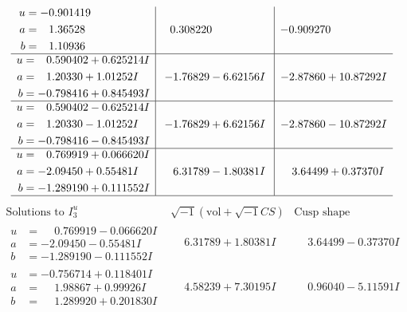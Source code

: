 \documentclass[1p]{elsarticle_modified}
\theoremstyle{definition}
\newcommand{\I}{\sqrt{-1}}
\begin{document}
$$\begin{array}{c|c|c}
\begin{aligned}
u &= -0.901419\phantom{ +0.000000I} \\
a &= \phantom{-}1.36528\phantom{ +0.000000I} \\
b &= \phantom{-}1.10936\phantom{ +0.000000I}\end{aligned}
 & \phantom{-}0.308220\phantom{ +0.000000I} & -0.909270\phantom{ +0.000000I} \\ \hline\begin{aligned}
u &= \phantom{-}0.590402 + 0.625214 I \\
a &= \phantom{-}1.20330 + 1.01252 I \\
b &= -0.798416 + 0.845493 I\end{aligned}
 & -1.76829 - 6.62156 I & -2.87860 + 10.87292 I \\ \hline\begin{aligned}
u &= \phantom{-}0.590402 - 0.625214 I \\
a &= \phantom{-}1.20330 - 1.01252 I \\
b &= -0.798416 - 0.845493 I\end{aligned}
 & -1.76829 + 6.62156 I & -2.87860 - 10.87292 I \\ \hline\begin{aligned}
u &= \phantom{-}0.769919 + 0.066620 I \\
a &= -2.09450 + 0.55481 I \\
b &= -1.289190 + 0.111552 I\end{aligned}
 & \phantom{-}6.31789 - 1.80381 I & \phantom{-}3.64499 + 0.37370 I\\
 \hline 
 \end{array}$$\newpage$$\begin{array}{c|c|c}  
\text{Solutions to }I^u_{3}& \I (\text{vol} + \sqrt{-1}CS) & \text{Cusp shape}\\
 \hline 
\begin{aligned}
u &= \phantom{-}0.769919 - 0.066620 I \\
a &= -2.09450 - 0.55481 I \\
b &= -1.289190 - 0.111552 I\end{aligned}
 & \phantom{-}6.31789 + 1.80381 I & \phantom{-}3.64499 - 0.37370 I \\ \hline\begin{aligned}
u &= -0.756714 + 0.118401 I \\
a &= \phantom{-}1.98867 + 0.99926 I \\
b &= \phantom{-}1.289920 + 0.201830 I\end{aligned}
 & \phantom{-}4.58239 + 7.30195 I & \phantom{-}0.96040 - 5.11591 I \\ \hline\begin{aligned}

\end{aligned}
\end{array}$$
\end{document}
